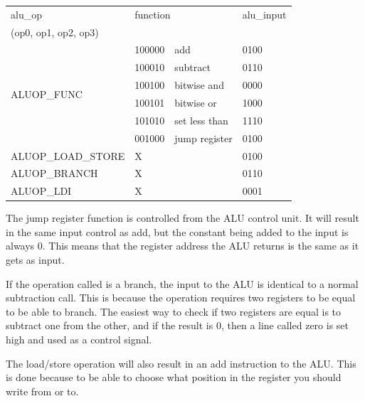 \begin{table}
	\label{table:alu_control_table}
    \begin{tabular}{|l|l|l|l|}
    \hline
    alu\_op           				& \multicolumn {2}{*}{function} 	& alu_input\\(op0, op1, op2, op3) \\ \hline
    \multirow {6}{*}{ALUOP\_FUNC}	& 100000   & add         			& 0100                            \\
                    				& 100010   & subtract  	 			& 0110                            \\
                    				& 100100   & bitwise and 			& 0000                            \\
                    				& 100101   & bitwise or    			& 1000                            \\
                    				& 101010   & set less than 			& 1110                            \\
									& 001000   & jump register 			& 0100                            \\ \hline
    ALUOP\_LOAD_STORE 				& \multicolumn {2}{*}{X}			& 0100                            \\ \hline
    ALUOP\_BRANCH     				& \multicolumn {2}{*}{X} 			& 0110                            \\ \hline
    ALUOP\_LDI        				& \multicolumn {2}{*}{X} 			& 0001                            \\ \hline
    \end{tabular}
\end{table}

The jump register function is controlled from the ALU control unit. It will result in the same input control as add, but the constant being added to the input is always 0. This means that the register address the ALU returns is the same as it gets as input. 

If the operation called is a branch, the input to the ALU is identical to a normal subtraction call. This is because the operation requires two registers to be equal to be able to branch. The easiest way to check if two registers are equal is to subtract one from the other, and if the result is 0, then a line called zero is set high and used as a control signal. 

The load/store operation will also result in an add instruction to the ALU. This is done because to be able to choose what position in the register you should write from or to. 

